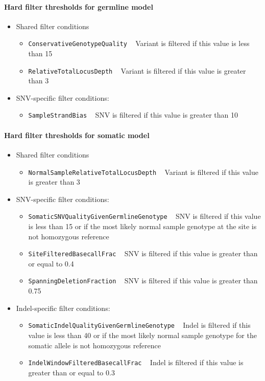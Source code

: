 \documentclass{article}
\begin{document}
\paragraph{Hard filter thresholds for germline model}

\begin{itemize}
    \item Shared filter conditions
    \begin{itemize}
        \item \texttt{ConservativeGenotypeQuality} ~ Variant is filtered if this value is less than 15
        \item \texttt{RelativeTotalLocusDepth} ~ Variant is filtered if this value is greater than 3
    \end{itemize}
    \item SNV-specific filter conditions:
    \begin{itemize}
        \item \texttt{SampleStrandBias} ~ SNV is filtered if this value is greater than 10
    \end{itemize}
\end{itemize}

\paragraph{Hard filter thresholds for somatic model}

\begin{itemize}
    \item Shared filter conditions
    \begin{itemize}
        \item \texttt{NormalSampleRelativeTotalLocusDepth} ~ Variant is filtered if this value is greater than 3
    \end{itemize}
    \item SNV-specific filter conditions:
    \begin{itemize}
        \item \texttt{SomaticSNVQualityGivenGermlineGenotype} ~ SNV is filtered if this value is less than 15 or if the most likely normal sample genotype at the site is not homozygous reference
        \item \texttt{SiteFilteredBasecallFrac} ~ SNV is filtered if this value is greater than or equal to 0.4
        \item \texttt{SpanningDeletionFraction} ~ SNV is filtered if this value is greater than 0.75
    \end{itemize}
    \item Indel-specific filter conditions:
    \begin{itemize}
        \item \texttt{SomaticIndelQualityGivenGermlineGenotype} ~ Indel is filtered if this value is less than 40 or if the most likely normal sample genotype for the somatic allele is not homozygous reference
        \item \texttt{IndelWindowFilteredBasecallFrac} ~ Indel is filtered if this value is greater than or equal to 0.3
    \end{itemize}
\end{itemize}
\end{document}
